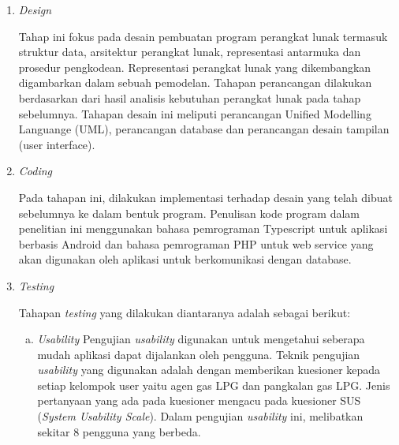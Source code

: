 \begin{enumerate}[1.]
\begin{enumerate}[a.]
		
	\end{enumerate}

	\item \textit{Design}
	
	Tahap ini fokus pada desain pembuatan program perangkat lunak termasuk struktur data, arsitektur perangkat lunak, representasi antarmuka dan prosedur pengkodean. Representasi perangkat lunak yang dikembangkan digambarkan dalam sebuah pemodelan. Tahapan perancangan dilakukan berdasarkan dari hasil analisis kebutuhan perangkat lunak pada tahap sebelumnya. Tahapan desain ini meliputi perancangan Unified Modelling Languange (UML), perancangan database dan perancangan desain tampilan (user interface).
	
	\item \textit{Coding}
	
	Pada tahapan ini, dilakukan implementasi terhadap desain yang telah dibuat sebelumnya ke dalam bentuk program. Penulisan kode program dalam penelitian ini menggunakan bahasa pemrograman Typescript untuk aplikasi berbasis Android dan bahasa pemrograman PHP untuk web service yang akan digunakan oleh aplikasi untuk berkomunikasi dengan database.
	
	\newpage
	 \item \textit{Testing}
	
	Tahapan \textit{testing} yang dilakukan diantaranya adalah sebagai berikut:
	\begin{enumerate}[a.]
			\itemsep0em
			\item \emph {Usability}
			\newline Pengujian \textit{usability} digunakan untuk mengetahui seberapa mudah aplikasi dapat dijalankan oleh pengguna. Teknik pengujian \textit{usability} yang digunakan adalah dengan memberikan kuesioner kepada setiap kelompok user yaitu agen gas LPG dan pangkalan gas LPG. Jenis pertanyaan yang ada pada kuesioner mengacu pada kuesioner SUS (\textit{System Usability Scale}). Dalam pengujian \textit{usability} ini, melibatkan sekitar 8 pengguna yang berbeda.
		
	\end{enumerate}
	
	
\end{enumerate}

